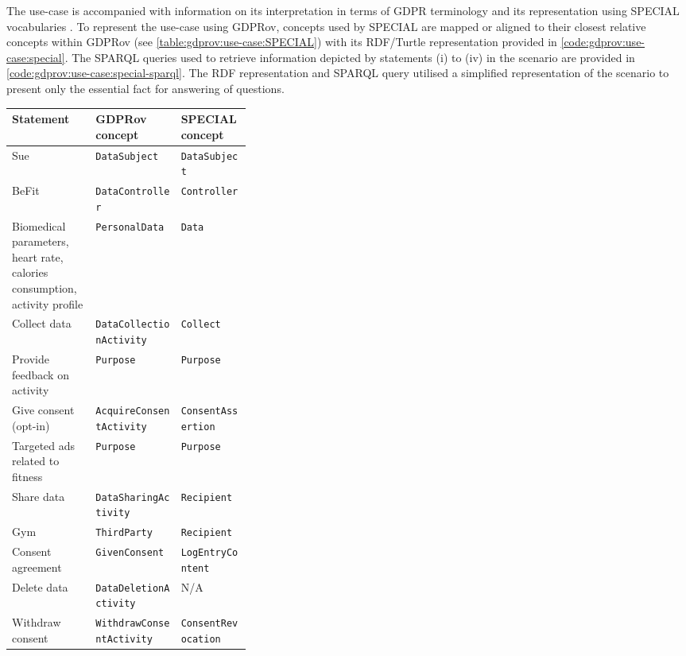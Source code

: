 The use-case is accompanied with information on its interpretation in terms of GDPR terminology \cite{bonatti_d1.7_2018} and its representation using  SPECIAL vocabularies \cite{kirrane_scalable_2018}. To represent the use-case using GDPRov, concepts used by SPECIAL are mapped or aligned to their closest relative concepts within GDPRov (see \autoref{table:gdprov:use-case:SPECIAL}) with its RDF/Turtle representation provided in \autoref{code:gdprov:use-case:special}. The SPARQL queries used to retrieve information depicted by statements (i) to (iv) in the scenario are provided in \autoref{code:gdprov:use-case:special-sparql}. The RDF representation and SPARQL query utilised a simplified representation of the scenario to present only the essential fact for answering of questions. 
\begin{center}
\footnotesize
\begin{tabularx}{\textwidth}{|p{0.35\linewidth}|X|X|}
\caption{GDPRov concepts to represent external use-case from SPECIAL} \label{table:gdprov:use-case:SPECIAL} \\
\toprule
\textbf{Statement} & \textbf{GDPRov concept} & \textbf{SPECIAL concept} \\
\midrule
\endhead
Sue & \texttt{DataSubject} & \texttt{DataSubject} \\ \hline
BeFit & \texttt{DataController} & \texttt{Controller} \\ \hline
Biomedical parameters, heart rate, calories consumption, activity profile & \texttt{PersonalData} & \texttt{Data} \\ \hline
Collect data & \texttt{DataCollectionActivity} & \texttt{Collect} \\ \hline
Provide feedback on activity & \texttt{Purpose} & \texttt{Purpose} \\ \hline
Give consent (opt-in) & \texttt{AcquireConsentActivity} & \texttt{ConsentAssertion} \\ \hline
Targeted ads related to fitness & \texttt{Purpose} & \texttt{Purpose} \\ \hline
Share data & \texttt{DataSharingActivity} & \texttt{Recipient} \\ \hline
Gym & \texttt{ThirdParty} & \texttt{Recipient} \\ \hline
Consent agreement & \texttt{GivenConsent} & \texttt{LogEntryContent} \\ \hline
Delete data & \texttt{DataDeletionActivity} & N/A \\ \hline
Withdraw consent & \texttt{WithdrawConsentActivity} & \texttt{ConsentRevocation} \\
\bottomrule
\end{tabularx}
\end{center}
